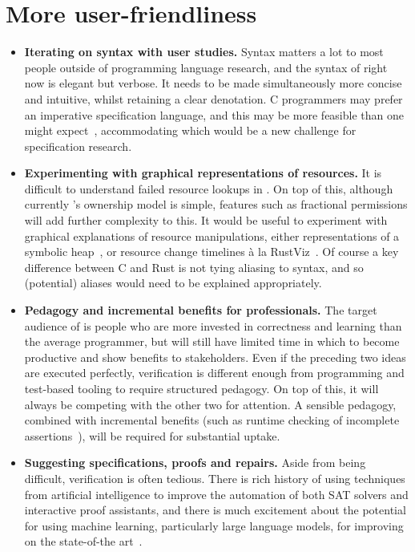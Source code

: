\section{More user-friendliness}

\begin{itemize}
    \item \textbf{Iterating on syntax with user studies.} Syntax matters
        a lot to most people outside of programming language research,
        and the syntax of  right now is elegant but verbose. It
        needs to be made simultaneously more concise and intuitive, whilst
        retaining a clear denotation. C programmers may prefer an imperative
        specification language, and this may be more feasible than one might
        expect~, accommodating which would be a new
        challenge for specification research.
    \item \textbf{Experimenting with graphical representations of resources.}
        It is difficult to understand failed resource lookups in .
        On top of this, although currently 's ownership model is simple,
        features such as fractional permissions will add further complexity to
        this. It would be useful to experiment with graphical explanations of
        resource manipulations, either representations of a symbolic
        heap~, or resource change timelines à la
        RustViz~.
        Of course a key difference between C and Rust is not tying aliasing
        to syntax, and so (potential) aliases would need to be explained
        appropriately.
    \item \textbf{Pedagogy and incremental benefits for professionals.}
        The target audience of  is people who are more invested in
        correctness and learning than the average programmer, but will still
        have limited time in which to become productive and show benefits
        to stakeholders. Even if the preceding two ideas are executed perfectly,
        verification is different enough from programming and test-based tooling
        to require structured pedagogy. On top of this, it will always be
        competing with the other two for attention. A sensible pedagogy,
        combined with incremental benefits (such as runtime checking of
        incomplete assertions~), will
        be required for substantial uptake.
    \item \textbf{Suggesting specifications, proofs and repairs.} Aside from
        being difficult, verification is often tedious. There is rich history
        of using techniques from artificial intelligence to improve the
        automation of both SAT solvers and interactive proof assistants, and
        there is much excitement about the potential for using machine
        learning, particularly large language models, for improving on the
        state-of-the art~.
\end{itemize}
